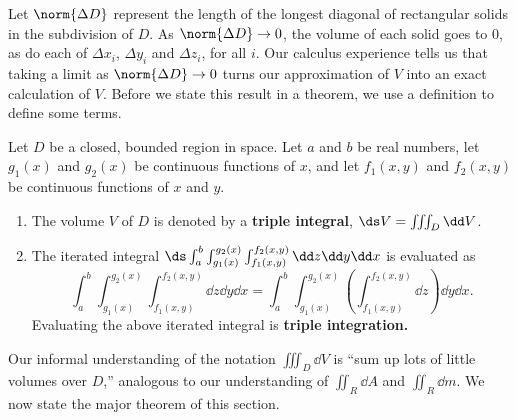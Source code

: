 Let $\norm{\Delta D}$ represent the length of the longest diagonal of rectangular solids in the subdivision of $D$. As $\norm{\Delta D}\to 0$, the volume of each solid goes to 0, as do each of $\Delta x_i$, $\Delta y_i$ and $\Delta z_i$, for all $i$. Our calculus experience tells us that taking a limit as $\norm{\Delta D}\to 0$ turns our approximation of $V$ into an exact calculation of $V$. Before we state this result in a theorem, we use a definition to define some terms.

{
\begin{definition}\label{def:triple_integral}
Let $D$ be a closed, bounded region in space. Let $a$ and $b$ be real numbers, let $g_1(x)$ and $g_2(x)$ be continuous functions of $x$, and let $f_1(x,y)$ and $f_2(x,y)$ be continuous functions of $x$ and $y$.
\begin{enumerate}
	\item	The volume $V$ of $D$ is denoted by a \textbf{triple integral},
	$\ds V = \iiint_D\dd V$.
	
	\item The iterated integral $\ds \int_a^b\int_{g_1(x)}^{g_2(x)}\int_{f_1(x,y)}^{f_2(x,y)} \dd z\dd y\dd x$ is evaluated as 
	\[\int_a^b\int_{g_1(x)}^{g_2(x)}\int_{f_1(x,y)}^{f_2(x,y)} \dd z\dd y\dd x=\int_a^b\int_{g_1(x)}^{g_2(x)}\left(\int_{f_1(x,y)}^{f_2(x,y)} \dd z\right)\dd y\dd x.\]
	Evaluating the above iterated integral is \textbf{triple integration.}
\end{enumerate}
\end{definition}
}

Our informal understanding of the notation $\iiint_D\dd V$ is ``sum up lots of little volumes over $D$,'' analogous to our understanding of $\iint_R\dd A$ and $\iint_R\dd m$. We now state the major theorem of this section.

